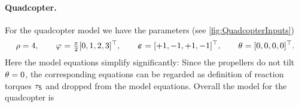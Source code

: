 \paragraph{Quadcopter.}
For the quadcopter model we have the parameters (see \autoref{fig:QuadcopterInputs})
\begin{align}
 \rho = 4,
\qquad
 \varphi_{} = \tfrac{\pi}{2} [0, 1, 2, 3]^\top,
\qquad
 \boldsymbol{\varepsilon_{}} = [+1, -1, +1, -1]^\top,
\qquad
 \theta_{} = [0, 0, 0, 0]^\top.
\end{align}
Here the model equations simplify significantly:
Since the propellers do not tilt $\theta_{} = 0$, the corresponding equations can be regarded as definition of reaction torques $\tau_{\mathsf{S}}$ and dropped from the model equations.
Overall the model for the quadcopter is
